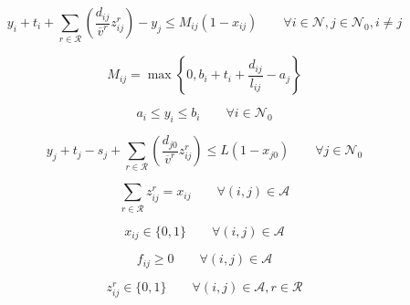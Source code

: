\documentclass{article}
\begin{document}
			\begin{equation}
				\label{eq:temporal_consistency}
				y_i + t_i + 
				\sum_{r \in \mathcal{R}} \left(\frac{d_{ij}}{\overline v^r} z_{ij}^{r}\right) - 
				y_j \leq
				M_{ij}(1 - x_{ij})
				\qquad
				\forall i \in \mathcal{N}, j \in \mathcal{N}_0, i \neq j
			\end{equation}

			$$M_{ij} = \max \left\{ 0, b_i + t_i + \frac{d_{ij}} {l_{ij}} - a_j\right\}$$

			\begin{equation}
				\label{eq:time_windows}
				a_i \leq y_i \leq b_i
				\qquad
				\forall i \in \mathcal{N}_0
			\end{equation}

			\begin{equation}
				\label{eq:total_temporal_constraint}
				y_j + t_j - s_j +
				\sum_{r \in \mathcal{R}}\left(\frac{d_{j0}}{\overline v^r}z_{ij}^{r}\right)
				\leq L(1-x_{j0})
				\qquad 
				\forall j \in \mathcal{N}_0
			\end{equation}
					
			\begin{equation}
				\label{eq:speed_level_constraint}
				\sum_{r \in \mathcal{R}}z_{ij}^{r} = x_{ij} 
				\qquad
				\forall (i,j) \in \mathcal{A}
			\end{equation}

			\begin{equation}
				\label{eq:assignment_var}
				x_{ij} \in \{0,1\} \qquad \forall (i,j) \in \mathcal{A}
			\end{equation}

			\begin{equation}
				\label{eq:assignment_var}
				f_{ij} \geq 0 \qquad \forall (i,j) \in \mathcal{A}
			\end{equation}

			\begin{equation}
				\label{eq:assignment_var}
				z_{ij}^r \in \{0,1\} \qquad \forall (i,j) \in \mathcal{A}, r \in \mathcal{R}
			\end{equation}
\end{document}

